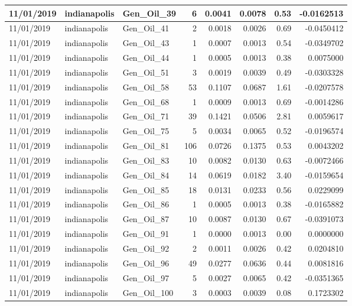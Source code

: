 \documentclass[
  letterpaper,
  DIV=11,
  numbers=noendperiod]{scrartcl}
\begin{document}
\begin{tabular}{l|l|l|r|r|r|r|r}
\hline
11/01/2019 & indianapolis & Gen\_Oil\_39 & 6 & 0.0041 & 0.0078 & 0.53 & -0.0162513\\
\hline
11/01/2019 & indianapolis & Gen\_Oil\_41 & 2 & 0.0018 & 0.0026 & 0.69 & -0.0450412\\
\hline
11/01/2019 & indianapolis & Gen\_Oil\_43 & 1 & 0.0007 & 0.0013 & 0.54 & -0.0349702\\
\hline
11/01/2019 & indianapolis & Gen\_Oil\_44 & 1 & 0.0005 & 0.0013 & 0.38 & 0.0075000\\
\hline
11/01/2019 & indianapolis & Gen\_Oil\_51 & 3 & 0.0019 & 0.0039 & 0.49 & -0.0303328\\
\hline
11/01/2019 & indianapolis & Gen\_Oil\_58 & 53 & 0.1107 & 0.0687 & 1.61 & -0.0207578\\
\hline
11/01/2019 & indianapolis & Gen\_Oil\_68 & 1 & 0.0009 & 0.0013 & 0.69 & -0.0014286\\
\hline
11/01/2019 & indianapolis & Gen\_Oil\_71 & 39 & 0.1421 & 0.0506 & 2.81 & 0.0059617\\
\hline
11/01/2019 & indianapolis & Gen\_Oil\_75 & 5 & 0.0034 & 0.0065 & 0.52 & -0.0196574\\
\hline
11/01/2019 & indianapolis & Gen\_Oil\_81 & 106 & 0.0726 & 0.1375 & 0.53 & 0.0043202\\
\hline
11/01/2019 & indianapolis & Gen\_Oil\_83 & 10 & 0.0082 & 0.0130 & 0.63 & -0.0072466\\
\hline
11/01/2019 & indianapolis & Gen\_Oil\_84 & 14 & 0.0619 & 0.0182 & 3.40 & -0.0159654\\
\hline
11/01/2019 & indianapolis & Gen\_Oil\_85 & 18 & 0.0131 & 0.0233 & 0.56 & 0.0229099\\
\hline
11/01/2019 & indianapolis & Gen\_Oil\_86 & 1 & 0.0005 & 0.0013 & 0.38 & -0.0165882\\
\hline
11/01/2019 & indianapolis & Gen\_Oil\_87 & 10 & 0.0087 & 0.0130 & 0.67 & -0.0391073\\
\hline
11/01/2019 & indianapolis & Gen\_Oil\_91 & 1 & 0.0000 & 0.0013 & 0.00 & 0.0000000\\
\hline
11/01/2019 & indianapolis & Gen\_Oil\_92 & 2 & 0.0011 & 0.0026 & 0.42 & 0.0204810\\
\hline
11/01/2019 & indianapolis & Gen\_Oil\_96 & 49 & 0.0277 & 0.0636 & 0.44 & 0.0081816\\
\hline
11/01/2019 & indianapolis & Gen\_Oil\_97 & 5 & 0.0027 & 0.0065 & 0.42 & -0.0351365\\
\hline
11/01/2019 & indianapolis & Gen\_Oil\_100 & 3 & 0.0003 & 0.0039 & 0.08 & 0.1723302\\

\end{tabular}
\end{document}

